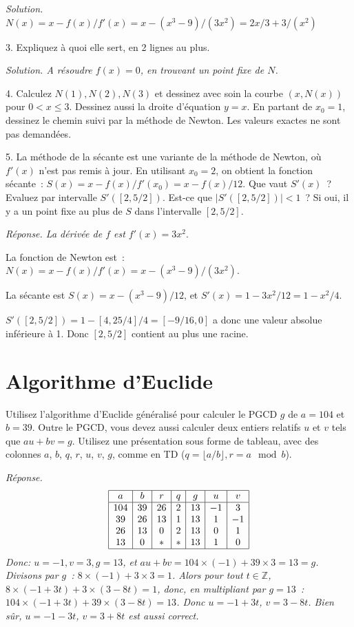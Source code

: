 \documentclass[11pt]{article}
\def\Z{\mathbb Z}
\begin{document}
\ifcorrige
{\it Solution. $N(x)=x - f(x)/f'(x)= x - (x^3-9)/(3x^2)=2x/3 + 3/(x^2)$
}
\else\fi


3. Expliquez à quoi elle sert, en 2 lignes au plus.

\ifcorrige
{\it Solution. A résoudre $f(x)=0$, en trouvant un point fixe de $N$.
}
\else\fi




4.  Calculez $N(1), N(2), N(3)$ et dessinez   avec soin la courbe $(x, N(x))$ pour $0 < x \le 3$.
Dessinez aussi la droite d'équation $y=x$.
En partant de $x_0=1$, dessinez 
le chemin suivi par la méthode de Newton. Les valeurs exactes ne sont pas demandées.

5. La méthode de la sécante est une variante de la méthode de Newton, où
$f'(x)$ n'est pas remis à jour. En utilisant $x_0=2$, 
on obtient la fonction sécante~: $S(x)=x - f(x)/f'(x_0)=x - f(x)/12$. Que vaut $S'(x)$~?
Evaluez par intervalle $S'([2, 5/2])$. Est-ce que $|S'([2, 5/2])| < 1$~?
Si oui, il y a un point fixe au plus de $S$ dans l'intervalle $[2, 5/2]$.  

\ifcorrige
{\it Réponse. La dérivée de $f$ est $f'(x)=3x^2.$

La fonction de Newton est~: $N(x)= x - f(x)/f'(x) = x - (x^3-9)/(3x^2)$.

La sécante est $S(x)= x - (x^3-9)/12$, et $S'(x)=1-3x^2/12=1-x^2/4$.

$S'([2, 5/2])= 1 - [4, 25/4]/4= [-9/16, 0]$ a donc une valeur absolue inférieure à 1. Donc $[2, 5/2]$ contient au plus une racine.
}
\else
\fi

{
\section{Algorithme d'Euclide}
Utilisez  l'algorithme d'Euclide généralisé
pour calculer le PGCD $g$ de $a=104$ et $b=39$. Outre le PGCD, vous devez
aussi calculer deux entiers relatifs $u$ et $v$ tels que $a u + b v=g$.
Utilisez une présentation sous forme de tableau, avec des colonnes $a$, $b$, $q$, $r$, $u$, $v$, $g$, comme en TD ($q=\lfloor a/b\rfloor, r=a \mod b$).
}

\ifcorrige
{\it Réponse.
$$\begin{array}{|c|c|c|c|c|c|c|}
\hline
a & b & r & q & g & u & v \\
\hline
104 & 39 & 26 & 2 & 13 & -1 & 3 \\
39 & 26 & 13 & 1 & 13 & 1 & -1 \\
26 & 13 & 0 & 2 & 13 & 0 & 1 \\
13 & 0 & * & * & 13 & 1 & 0 \\
\hline
\end{array}
$$
Donc: $u=-1, v=3, g=13$, et $au+bv=104\times  (-1) + 39\times 3= 13=g$.
Divisons par $g$~: $8\times (-1) + 3\times 3=1$. Alors pour tout $t\in \Z$,
$8\times (-1+3t) + 3\times (3-8t)=1$, donc, en multipliant par $g=13$~: $104\times (-1+3t) + 39\times (3-8t)=13$.
Donc $u=-1+3t$, $v=3-8t$. Bien sûr, $u=-1-3t$, $v=3+8t$ est aussi correct.
}
\else\fi
\end{document}
